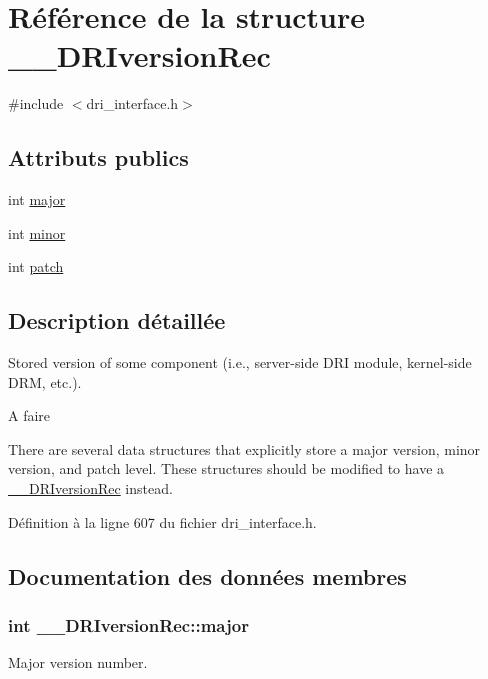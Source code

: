 \hypertarget{struct_____d_r_iversion_rec}{\section{Référence de la structure \-\_\-\-\_\-\-D\-R\-Iversion\-Rec}
\label{struct_____d_r_iversion_rec}
}


{\ttfamily \#include $<$dri\-\_\-interface.\-h$>$}

\subsection*{Attributs publics}
\begin{DoxyCompactItemize}
\item 
int \hyperlink{struct_____d_r_iversion_rec_a9cb2a493f978f3f0eb79b5cb5385be6e}{major}
\item 
int \hyperlink{struct_____d_r_iversion_rec_a315635b82bb1a773097074ef6db3481b}{minor}
\item 
int \hyperlink{struct_____d_r_iversion_rec_af1b4ce3ade39632a6d4e0f1ffbb79323}{patch}
\end{DoxyCompactItemize}


\subsection{Description détaillée}
Stored version of some component (i.\-e., server-\/side D\-R\-I module, kernel-\/side D\-R\-M, etc.).

\begin{DoxyRefDesc}{A faire}
\item[\hyperlink{todo__todo000001}{A faire}]There are several data structures that explicitly store a major version, minor version, and patch level. These structures should be modified to have a {\ttfamily \hyperlink{struct_____d_r_iversion_rec}{\-\_\-\-\_\-\-D\-R\-Iversion\-Rec}} instead. \end{DoxyRefDesc}


Définition à la ligne 607 du fichier dri\-\_\-interface.\-h.



\subsection{Documentation des données membres}
\hypertarget{struct_____d_r_iversion_rec_a9cb2a493f978f3f0eb79b5cb5385be6e}{
\subsubsection[{major}]{\setlength{\rightskip}{0pt plus 5cm}int \-\_\-\-\_\-\-D\-R\-Iversion\-Rec\-::major}}\label{struct_____d_r_iversion_rec_a9cb2a493f978f3f0eb79b5cb5385be6e}
Major version number. 

